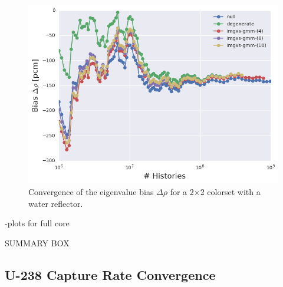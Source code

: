 \clearpage

\begin{figure}[h!]
\centering
\includegraphics[width=0.87\linewidth]{figures/results/convergence/reflector/keff-bias-evo}
\vspace{2mm}
\caption[Eigenvalue bias covergence for a 2$\times$2 colorset with reflector]{Convergence of the eigenvalue bias $\Delta\rho$ for a 2$\times$2 colorset with a water reflector.}
\label{fig:chap11-refl-eigenvalue-converge}
\end{figure}

\clearpage

-plots for full core

SUMMARY BOX


\subsection{U-238 Capture Rate Convergence}
\label{subsec:chap11-capture-converge}

\clearpage


